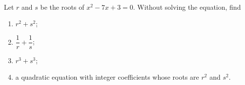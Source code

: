 Let $r$ and $s$ be the roots of $x^2-7x+3=0$. Without solving the equation, find
\begin{enumerate}
\item[(a)] $r^2+s^2$;
\item[(b)] $\dfrac{1}{r}+\dfrac{1}{s}$;
\item[(c)] $r^3+s^3$;
\item[(d)] a quadratic equation with integer coefficients whose roots are $r^2$ and $s^2$.
\end{enumerate}
